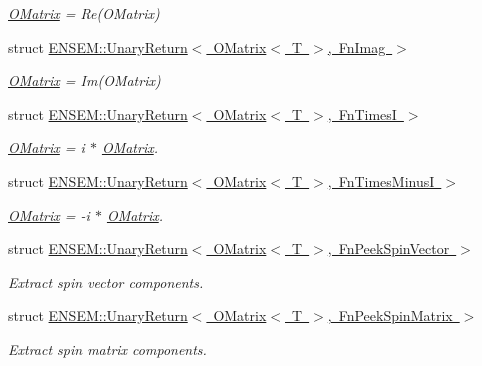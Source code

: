 \begin{DoxyCompactItemize}
\begin{DoxyCompactList}\small\item\em \mbox{\hyperlink{classENSEM_1_1OMatrix}{O\+Matrix}} = Re(\+O\+Matrix) \end{DoxyCompactList}\item 
struct \mbox{\hyperlink{structENSEM_1_1UnaryReturn_3_01OMatrix_3_01T_01_4_00_01FnImag_01_4}{E\+N\+S\+E\+M\+::\+Unary\+Return$<$ O\+Matrix$<$ T $>$, Fn\+Imag $>$}}
\begin{DoxyCompactList}\small\item\em \mbox{\hyperlink{classENSEM_1_1OMatrix}{O\+Matrix}} = Im(\+O\+Matrix) \end{DoxyCompactList}\item 
struct \mbox{\hyperlink{structENSEM_1_1UnaryReturn_3_01OMatrix_3_01T_01_4_00_01FnTimesI_01_4}{E\+N\+S\+E\+M\+::\+Unary\+Return$<$ O\+Matrix$<$ T $>$, Fn\+Times\+I $>$}}
\begin{DoxyCompactList}\small\item\em \mbox{\hyperlink{classENSEM_1_1OMatrix}{O\+Matrix}} = i $\ast$ \mbox{\hyperlink{classENSEM_1_1OMatrix}{O\+Matrix}}. \end{DoxyCompactList}\item 
struct \mbox{\hyperlink{structENSEM_1_1UnaryReturn_3_01OMatrix_3_01T_01_4_00_01FnTimesMinusI_01_4}{E\+N\+S\+E\+M\+::\+Unary\+Return$<$ O\+Matrix$<$ T $>$, Fn\+Times\+Minus\+I $>$}}
\begin{DoxyCompactList}\small\item\em \mbox{\hyperlink{classENSEM_1_1OMatrix}{O\+Matrix}} = -\/i $\ast$ \mbox{\hyperlink{classENSEM_1_1OMatrix}{O\+Matrix}}. \end{DoxyCompactList}\item 
struct \mbox{\hyperlink{structENSEM_1_1UnaryReturn_3_01OMatrix_3_01T_01_4_00_01FnPeekSpinVector_01_4}{E\+N\+S\+E\+M\+::\+Unary\+Return$<$ O\+Matrix$<$ T $>$, Fn\+Peek\+Spin\+Vector $>$}}
\begin{DoxyCompactList}\small\item\em Extract spin vector components. \end{DoxyCompactList}\item 
struct \mbox{\hyperlink{structENSEM_1_1UnaryReturn_3_01OMatrix_3_01T_01_4_00_01FnPeekSpinMatrix_01_4}{E\+N\+S\+E\+M\+::\+Unary\+Return$<$ O\+Matrix$<$ T $>$, Fn\+Peek\+Spin\+Matrix $>$}}
\begin{DoxyCompactList}\small\item\em Extract spin matrix components. \end{DoxyCompactList}\item 

\end{DoxyCompactItemize}
